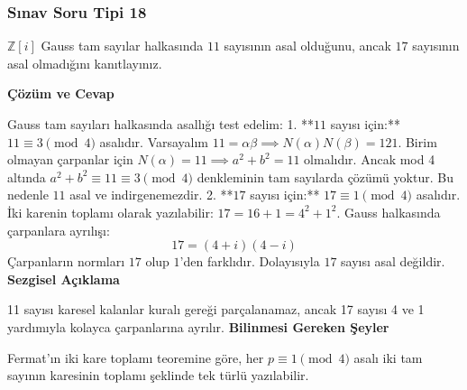 \documentclass[11pt, a4paper]{article}
\newenvironment{cozum}{
    \vspace{0.5cm}
    \noindent\textcolor{green!60!black}{\faCheckCircle\enspace \textbf{\Large Çözüm ve Cevap}}\par\vspace{0.2cm}
}{}
\newenvironment{sezgisel}{
    \vspace{0.5cm}
    \noindent\textcolor{orange!80!black}{\faLightbulb\enspace \textbf{\Large Sezgisel Açıklama}}\par\vspace{0.2cm}
    \itshape
}{}
\newenvironment{bilgi}{
    \vspace{0.5cm}
    \noindent\textcolor{red!70!black}{\faExclamationTriangle\enspace \textbf{\Large Bilinmesi Gereken Şeyler}}\par\vspace{0.2cm}
}{}
\begin{document}
\subsubsection{Sınav Soru Tipi 18}
\begin{sinavbox}
$\mathbb{Z}[i]$ Gauss tam sayılar halkasında $11$ sayısının asal olduğunu, ancak $17$ sayısının asal olmadığını kanıtlayınız.
\end{sinavbox}
\begin{cozum}
Gauss tam sayıları halkasında asallığı test edelim:
1. **$11$ sayısı için:**
   $11 \equiv 3 \pmod 4$ asalıdır. Varsayalım $11 = \alpha\beta \implies N(\alpha)N(\beta) = 121$.
   Birim olmayan çarpanlar için $N(\alpha) = 11 \implies a^2+b^2 = 11$ olmalıdır.
   Ancak mod 4 altında $a^2+b^2 \equiv 11 \equiv 3 \pmod 4$ denkleminin tam sayılarda çözümü yoktur.
   Bu nedenle $11$ asal ve indirgenemezdir.
2. **$17$ sayısı için:**
   $17 \equiv 1 \pmod 4$ asalıdır. İki karenin toplamı olarak yazılabilir: $17 = 16+1 = 4^2+1^2$.
   Gauss halkasında çarpanlara ayrılışı:
   \[ 17 = (4+i)(4-i) \]
   Çarpanların normları $17$ olup $1$'den farklıdır. Dolayısıyla $17$ sayısı asal değildir.
\end{cozum}
\begin{sezgisel}
11 sayısı karesel kalanlar kuralı gereği parçalanamaz, ancak 17 sayısı 4 ve 1 yardımıyla kolayca çarpanlarına ayrılır.
\end{sezgisel}
\begin{bilgi}
Fermat'ın iki kare toplamı teoremine göre, her $p \equiv 1 \pmod 4$ asalı iki tam sayının karesinin toplamı şeklinde tek türlü yazılabilir.
\end{bilgi}

\newpage
\end{document}
